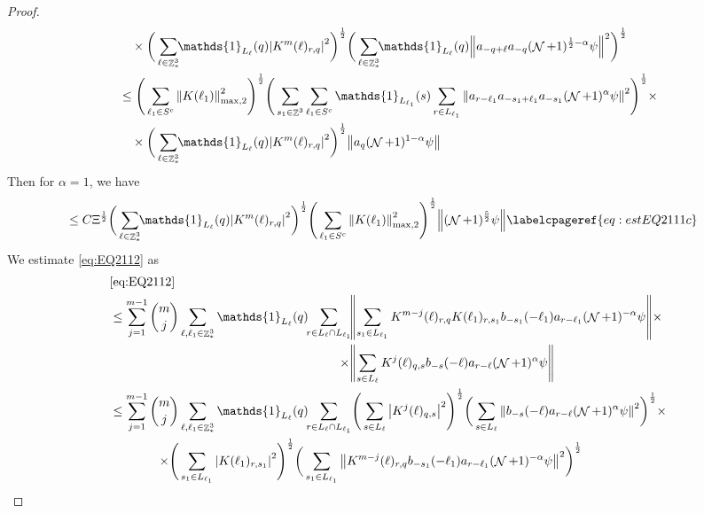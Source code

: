\documentclass[12pt,a4paper]{article}
\numberwithin{equation}{section}
\newcommand{\1}{\mathbb{I}}
\DeclareMathOperator{\Z}{\mathbb{Z}}
\DeclareMathOperator{\NN}{\mathcal{N}}
\newcommand{\half}{\frac{1}{2}}
\newcommand{\normmaxii}[1]{\norm{#1}_{\mathrm{max,2}}}
\theoremstyle{plain}
\theoremstyle{definition}
\theoremstyle{remark}
\theoremstyle{plain}
\theoremstyle{definition}
\theoremstyle{remark}
\begin{document}
\begin{proof}
\begin{align}
		&\quad \times  \bigg(\sum\limits_{\ell \in \Z^3_*} \!\!\mathds{1}_{L_\ell}(q)\abs{  K^{m}(\ell)_{r,q}}^2\bigg)^\half \bigg(\sum\limits_{\ell \in \Z^3_*} \!\!\mathds{1}_{L_\ell}(q)\norm{a_{-q+\ell}a_{-q} (\NN+1)^{\half-\alpha}\psi }^2\bigg)^\half \nonumber\\
		&\leq\Bigg( \sum\limits_{ \ell_1 \in S^c}    \normmaxii{K(\ell_1)}^2\Bigg)^\half \Bigg(  \sum\limits_{s_1 \in \Z^3} \sum\limits_{ \ell_1 \in S^c} \mathds{1}_{L_{\ell_1}}(s) \sum\limits_{r \in L_{\ell_1}} \norm{ a_{r-\ell_1} a_{-s_1+\ell_1}a_{-s_1}   (\NN+1)^{\alpha}\psi}^2\Bigg)^\half \times\nonumber\\
		&\quad \times \bigg(\sum\limits_{\ell \in \Z^3_*} \!\!\mathds{1}_{L_\ell}(q)\abs{  K^{m}(\ell)_{r,q}}^2\bigg)^\half \norm{a_{q} (\NN+1)^{1-\alpha}\psi } \nonumber\\
	\end{align}
	Then for $\alpha = 1$, we have 
	\begin{align}
		&\leq C \Xi^{\half}\bigg(\sum\limits_{\ell \in \Z^3_*} \!\!\mathds{1}_{L_\ell}(q)\abs{  K^{m}(\ell)_{r,q}}^2\bigg)^\half \Bigg( \sum\limits_{ \ell_1 \in S^c}    \normmaxii{K(\ell_1)}^2\Bigg)^\half  \norm{    (\NN+1)^{\frac{5}{2}}\psi} \labelcpageref{eq:estEQ2111c}
	\end{align}
	We estimate \eqref{eq:EQ2112} as 
	\begin{alignat}{2}
		&\eqref{eq:EQ2112}\nonumber\\
		&\leq \sum\limits_{j=1}^{m-1} {{m}\choose j} \sum\limits_{\ell, \ell_1\in \Z^3_*} \mathds{1}_{L_{\ell}}(q)\!\! \begin{aligned}[t]
			\sum\limits_{r\in L_{\ell} \cap L_{\ell_1}}\! &\norm{  \sum\limits_{s_1 \in L_{\ell_1}} K^{m-j}(\ell)_{r,q} K(\ell_1)_{r,s_1} b_{-s_1}(-\ell_1) a_{r-\ell_1} (\NN+1)^{-\alpha}\psi}\times\nonumber \\\times &\norm{\sum\limits_{s \in L_\ell} K^{j}(\ell)_{q,s}  b_{-s}(-\ell)  a_{r-\ell} (\NN+1)^{\alpha}\psi }
		\end{aligned} \nonumber\\
		&\leq \sum\limits_{j=1}^{m-1} \begin{aligned}[t] {{m}\choose j} &\sum\limits_{\ell, \ell_1\in \Z^3_*} \mathds{1}_{L_{\ell}}(q)\!\! 
			\sum\limits_{r\in L_{\ell} \cap L_{\ell_1}}\! \Bigg( \sum\limits_{s \in L_\ell} \abs{K^{j}(\ell)_{q,s}}^2\Bigg)^\half \bigg( \sum\limits_{s \in L_\ell}\norm{  b_{-s}(-\ell) a_{r-\ell} (\NN+1)^{\alpha}\psi}^2\bigg)^\half \times\nonumber\\ \times \Bigg( &\sum\limits_{s_1 \in L_{\ell_1}}\abs{K(\ell_1)_{r,s_1}}^2\Bigg)^\half \bigg(\sum\limits_{s_1 \in L_{\ell_1}}\norm{ K^{m-j}(\ell)_{r,q}  b_{-s_1}(-\ell_1)  a_{r-\ell_1} (\NN+1)^{-\alpha}\psi }^2\bigg)^\half

\end{aligned}
\end{alignat}
\end{proof}
\end{document}
